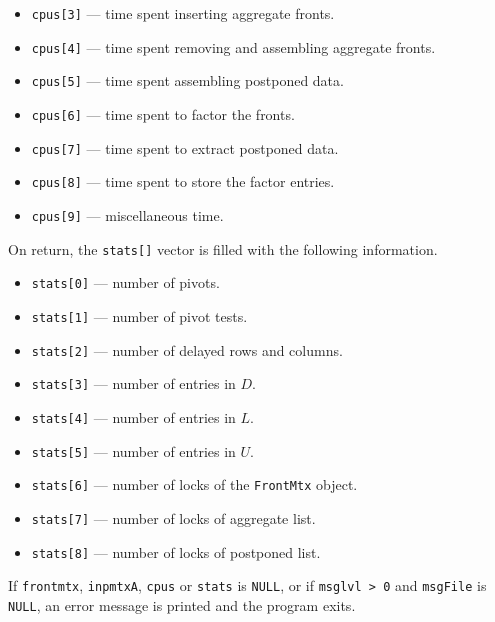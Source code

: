 \begin{enumerate}
\begin{itemize}
\item
{\tt cpus[3]} --- time spent inserting aggregate fronts.
\item
{\tt cpus[4]} --- time spent removing and assembling aggregate fronts.
\item
{\tt cpus[5]} --- time spent assembling postponed data.
\item
{\tt cpus[6]} --- time spent to factor the fronts.
\item
{\tt cpus[7]} --- time spent to extract postponed data.
\item
{\tt cpus[8]} --- time spent to store the factor entries.
\item
{\tt cpus[9]} --- miscellaneous time.
\end{itemize}
On return, the {\tt stats[]} vector is filled with the following
information.
\begin{itemize}
\item
{\tt stats[0]} --- number of pivots.
\item
{\tt stats[1]} --- number of pivot tests.
\item
{\tt stats[2]} --- number of delayed rows and columns.
\item
{\tt stats[3]} --- number of entries in $D$.
\item
{\tt stats[4]} --- number of entries in $L$.
\item
{\tt stats[5]} --- number of entries in $U$.
\item
{\tt stats[6]} --- number of locks of the {\tt FrontMtx} object.
\item
{\tt stats[7]} --- number of locks of aggregate list.
\item
{\tt stats[8]} --- number of locks of postponed list.
\end{itemize}
\par {}
If {\tt frontmtx}, {\tt inpmtxA}, {\tt cpus} or {\tt stats}
is {\tt NULL},
or if {\tt msglvl > 0} and {\tt msgFile} is {\tt NULL},
an error message is printed and the program exits.
\end{enumerate}
\par
